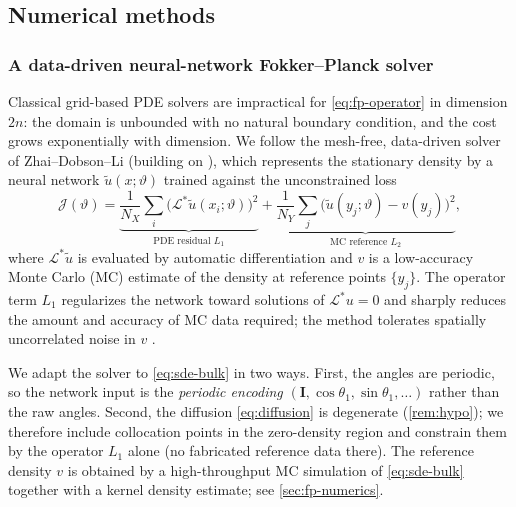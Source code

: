 \documentclass[11pt,a4paper]{article}
\theoremstyle{definition}
\numberwithin{equation}{section}   %
\newcommand{\bI}{\mathbf{I}}
\newcommand{\Ladj}{\mathcal{L}^{*}}
\begin{document}
\subsection{Numerical methods}\label{sec:methods}

\subsubsection{A data-driven neural-network Fokker--Planck solver}
Classical grid-based PDE solvers are impractical for \eqref{eq:fp-operator} in
dimension $2n$: the domain is unbounded with no natural boundary condition, and
the cost grows exponentially with dimension. We follow the mesh-free,
data-driven solver of Zhai--Dobson--Li \cite{ZhaiDobsonLi} (building on
\cite{Li2019,DobsonLiZhai}), which represents the stationary density by a neural
network $\tilde u(x;\vartheta)$ trained against the unconstrained loss
\begin{equation}\label{eq:nn-loss}
  \mathcal{J}(\vartheta)
  = \underbrace{\frac{1}{N_X}\sum_{i}\big(\Ladj \tilde u(x_i;\vartheta)\big)^2}_{\text{PDE residual } L_1}
  + \underbrace{\frac{1}{N_Y}\sum_{j}\big(\tilde u(y_j;\vartheta)-v(y_j)\big)^2}_{\text{MC reference } L_2},
\end{equation}
where $\Ladj\tilde u$ is evaluated by automatic differentiation and $v$ is a
low-accuracy Monte Carlo (MC) estimate of the density at reference points
$\{y_j\}$. The operator term $L_1$ regularizes the network toward solutions of
$\Ladj u=0$ and sharply reduces the amount and accuracy of MC data required;
the method tolerates spatially uncorrelated noise in $v$ \cite{ZhaiDobsonLi}.

We adapt the solver to \eqref{eq:sde-bulk} in two ways. First, the angles are
periodic, so the network input is the \emph{periodic encoding}
$(\bI,\cos\theta_1,\sin\theta_1,\dots)$ rather than the raw angles. Second, the
diffusion \eqref{eq:diffusion} is degenerate (\cref{rem:hypo}); we therefore
include collocation points in the zero-density region and constrain them by the
operator $L_1$ alone (no fabricated reference data there). The reference density
$v$ is obtained by a high-throughput MC simulation of \eqref{eq:sde-bulk}
together with a kernel density estimate; see \cref{sec:fp-numerics}.
\end{document}
